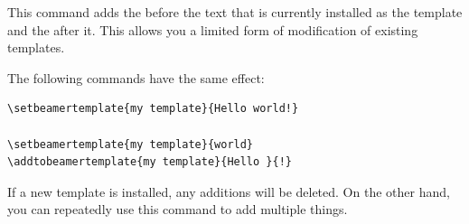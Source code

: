 \begin{command}{\addtobeamertemplate{}}
  This command adds the  before the text that is currently installed as the template  and the  after it. This allows you a limited form of modification of existing templates.

  \example
  The following commands have the same effect:

\begin{verbatim}
\setbeamertemplate{my template}{Hello world!}

\setbeamertemplate{my template}{world}
\addtobeamertemplate{my template}{Hello }{!}
\end{verbatim}

  If a new template is installed, any additions will be deleted. On the other hand, you can repeatedly use this command to add multiple things.
\end{command}

